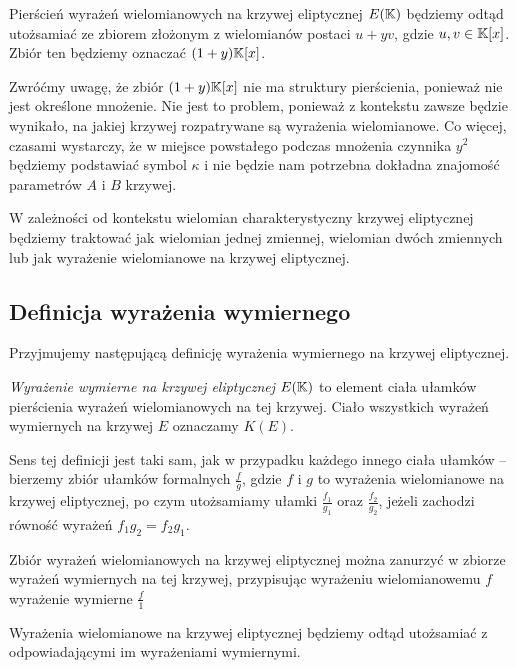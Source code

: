 \begin{remark}
Pierścień wyrażeń wielomianowych na krzywej eliptycznej $E(\mathbb{K})$
będziemy odtąd utożsamiać ze zbiorem
złożonym z wielomianów postaci $u + yv$,
gdzie $u, v \in \mathbb{K}[x]$.
Zbiór ten będziemy oznaczać $(1 + y)\mathbb{K}[x]$.
\end{remark}

Zwróćmy uwagę, że zbiór $(1 + y)\mathbb{K}[x]$ nie ma struktury pierścienia,
ponieważ nie jest określone mnożenie.
Nie jest to problem,
ponieważ z kontekstu zawsze będzie wynikało,
na jakiej krzywej rozpatrywane są wyrażenia wielomianowe.
Co więcej, czasami wystarczy,
że w miejsce powstałego podczas mnożenia czynnika $y^2$
będziemy podstawiać symbol $\kappa$
i nie będzie nam potrzebna dokładna znajomość parametrów $A$ i $B$ krzywej.

\begin{remark}
W zależności od kontekstu wielomian charakterystyczny krzywej eliptycznej
będziemy traktować jak wielomian jednej zmiennej, wielomian dwóch zmiennych
lub jak wyrażenie wielomianowe na krzywej eliptycznej.
\end{remark}

\subsection*{Definicja wyrażenia wymiernego}

Przyjmujemy następującą definicję
wyrażenia wymiernego na krzywej eliptycznej.

\begin{definition}
\emph{Wyrażenie wymierne na krzywej eliptycznej $E(\mathbb{K})$}
to element ciała ułamków pierścienia wyrażeń wielomianowych na tej krzywej.
Ciało wszystkich wyrażeń wymiernych na krzywej $E$
oznaczamy $K(E)$.
\end{definition}

Sens tej definicji jest taki sam,
jak w przypadku każdego innego ciała ułamków --
bierzemy zbiór ułamków formalnych $\frac{f}{g}$,
gdzie $f$ i $g$ to wyrażenia wielomianowe na krzywej eliptycznej,
po czym utożsamiamy ułamki $\frac{f_1}{g_1}$ oraz $\frac{f_2}{g_2}$,
jeżeli zachodzi równość wyrażeń $f_1g_2 = f_2g_1$.

\begin{fact}
Zbiór wyrażeń wielomianowych na krzywej eliptycznej
można zanurzyć w zbiorze wyrażeń wymiernych na tej krzywej,
przypisując wyrażeniu wielomianowemu $f$ wyrażenie wymierne $\frac{f}{1}$
\end{fact}

\begin{remark}
Wyrażenia wielomianowe na krzywej eliptycznej
będziemy odtąd utożsamiać z odpowiadającymi im wyrażeniami wymiernymi.
\end{remark}

